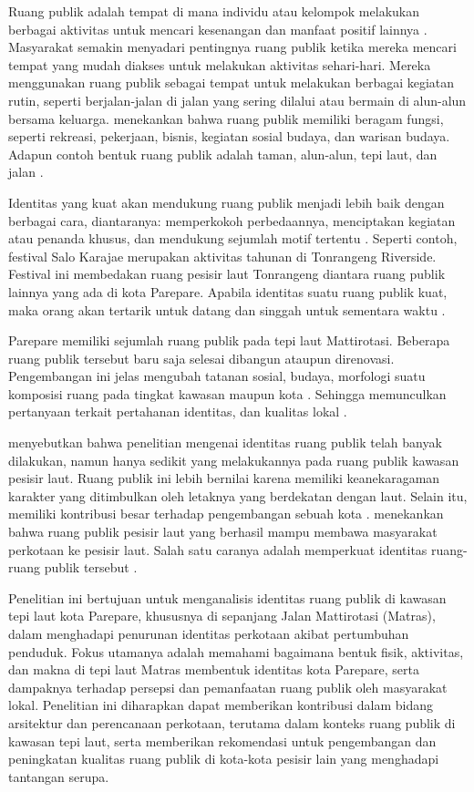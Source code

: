 \documentclass[11pt]{simart} %
\begin{document}
Ruang publik adalah tempat di mana individu atau kelompok melakukan berbagai aktivitas untuk mencari kesenangan dan manfaat positif lainnya \citep{hajmirsadeghi2012}. Masyarakat semakin menyadari pentingnya ruang publik ketika mereka mencari tempat yang mudah diakses untuk melakukan aktivitas sehari-hari. Mereka menggunakan ruang publik sebagai tempat untuk melakukan berbagai kegiatan rutin, seperti berjalan-jalan di jalan yang sering dilalui atau bermain di alun-alun bersama keluarga. \cite{hajmirsadeghi2012} menekankan bahwa ruang publik memiliki beragam fungsi, seperti rekreasi, pekerjaan, bisnis, kegiatan sosial budaya, dan warisan budaya. Adapun contoh bentuk ruang publik adalah taman, alun-alun, tepi laut, dan jalan \citep{hajmirsadeghi2012}.

Identitas yang kuat akan mendukung ruang publik menjadi lebih baik dengan berbagai cara, diantaranya: memperkokoh perbedaannya, menciptakan kegiatan atau penanda khusus, dan mendukung sejumlah motif tertentu \citep{hartanti2014}. Seperti contoh, festival Salo Karajae merupakan aktivitas tahunan di Tonrangeng Riverside. Festival ini membedakan ruang pesisir laut Tonrangeng diantara ruang publik lainnya yang ada di kota Parepare. Apabila identitas suatu ruang publik kuat, maka orang akan tertarik untuk datang dan singgah untuk sementara waktu \citep{oktay2002}.

Parepare memiliki sejumlah ruang publik pada tepi laut Mattirotasi. Beberapa ruang publik tersebut baru saja selesai dibangun ataupun direnovasi. Pengembangan ini jelas mengubah tatanan sosial, budaya, morfologi suatu komposisi ruang pada tingkat kawasan maupun kota \citep{kaymaz2013,oktay2002}. Sehingga memunculkan pertanyaan terkait pertahanan identitas, dan kualitas lokal \citep{kaymaz2013}.

\cite{oktay2015} menyebutkan bahwa penelitian mengenai identitas ruang publik telah banyak dilakukan, namun hanya sedikit yang melakukannya pada ruang publik kawasan pesisir laut. Ruang publik ini lebih bernilai karena memiliki keanekaragaman karakter yang ditimbulkan oleh letaknya yang berdekatan dengan laut. Selain itu, memiliki kontribusi besar terhadap pengembangan sebuah kota \citep{hussein2014}. \cite{hussein2014} menekankan bahwa ruang publik pesisir laut yang berhasil mampu membawa masyarakat perkotaan ke pesisir laut. Salah satu caranya adalah memperkuat identitas ruang-ruang publik tersebut \citep{oktay2002}.

Penelitian ini bertujuan untuk menganalisis identitas ruang publik di kawasan tepi laut kota Parepare, khususnya di sepanjang Jalan Mattirotasi (Matras), dalam menghadapi penurunan identitas perkotaan akibat pertumbuhan penduduk. Fokus utamanya adalah memahami bagaimana bentuk fisik, aktivitas, dan makna di tepi laut Matras membentuk identitas kota Parepare, serta dampaknya terhadap persepsi dan pemanfaatan ruang publik oleh masyarakat lokal. Penelitian ini diharapkan dapat memberikan kontribusi dalam bidang arsitektur dan perencanaan perkotaan, terutama dalam konteks ruang publik di kawasan tepi laut, serta memberikan rekomendasi untuk pengembangan dan peningkatan kualitas ruang publik di kota-kota pesisir lain yang menghadapi tantangan serupa.
\end{document}

